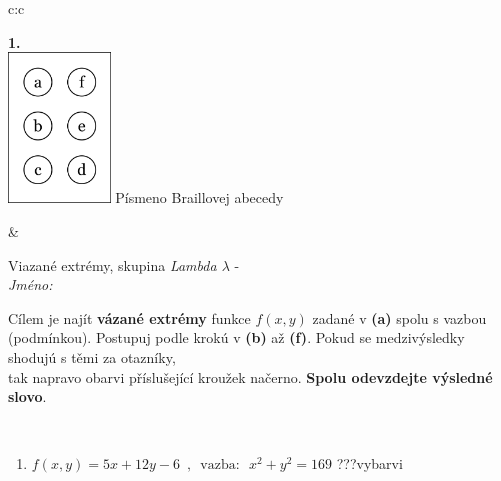 \documentclass[10pt]{report}
\begin{document}
\begin{tabular}{c:c}
\begin{minipage}[c][104.5mm][t]{0.5\linewidth}
\begin{center}
\begin{minipage}{0.79\linewidth}
\begin{center}
\begin{varwidth}{\linewidth}
\begin{enumerate}
\end{enumerate}
\end{varwidth}
\end{center}
\end{minipage}
\begin{minipage}{0.20\linewidth}
\begin{center}
{\Huge\bfseries 1.} \\[2mm]
\includegraphics[height=40mm]{../images/braille.png}
{\small Písmeno Braillovej abecedy}
\end{center}
\end{minipage}
\end{center}
\end{minipage}
&
\begin{minipage}[c][104.5mm][t]{0.5\linewidth}
\begin{center}
\vspace{7mm}
{\huge Viazané extrémy, skupina \textit{Lambda $\lambda$} -}\\[5mm]
\textit{Jméno:}\phantom{xxxxxxxxxxxxxxxxxxxxxxxxxxxxxxxxxxxxxxxxxxxxxxxxxxxxxxxxxxxxxxxxx}\\[5mm]
\begin{minipage}{0.95\linewidth}
\begin{center}
Cílem je najít \textbf{vázané extrémy} funkce $f(x,y)$ zadané v \textbf{(a)} spolu s vazbou (podmínkou). Postupuj podle krokú v \textbf{(b)} až \textbf{(f)}. Pokud se medzivýsledky shodujú s těmi za otazníky,\\tak napravo obarvi příslušející kroužek načerno. \textbf{Spolu odevzdejte výsledné slovo}.
\end{center}
\end{minipage}
\\[1mm]
\begin{minipage}{0.79\linewidth}
\begin{center}
\begin{varwidth}{\linewidth}
\begin{enumerate}
\normalsize
\item $f(x,y)=5x+12y-6 \enspace , \enspace \mathrm{vazba:} \enspace x^2+y^2=169$\quad \dotfill\; ???\;\dotfill \quad vybarvi

\end{enumerate}
\end{varwidth}
\end{center}
\end{minipage}
\end{center}
\end{minipage}
\end{tabular}
\end{document}
